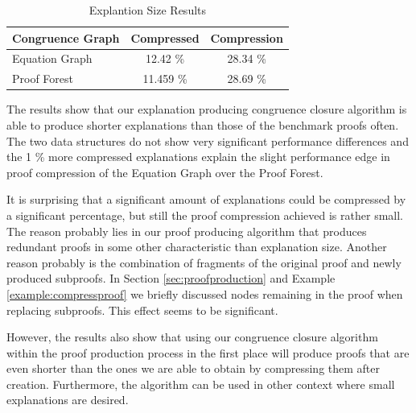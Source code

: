 
\begin{table}[h]
\centering
\begin{tabular}{l c c}
\toprule
\textbf{Congruence Graph} & \textbf{Compressed} & \textbf{Compression} \\ 
\midrule

Equation Graph & 12.42 \% & 28.34 \% \\ 
Proof Forest & 11.459 \% & 28.69 \% \\ 

\bottomrule
\end{tabular}
\caption{Explantion Size Results}
\label{tab:explanation_results}
\end{table}

The results show that our explanation producing congruence closure algorithm is able to produce shorter explanations than those of the benchmark proofs often.
The two data structures do not show very significant performance differences and the 1 \% more compressed explanations explain the slight performance edge in proof compression of the Equation Graph over the Proof Forest.

It is surprising that a significant amount of explanations could be compressed by a significant percentage, but still the proof compression achieved is rather small.
The reason probably lies in our proof producing algorithm that produces redundant proofs in some other characteristic than explanation size.
Another reason probably is the combination of fragments of the original proof and newly produced subproofs.
In Section \ref{sec:proofproduction} and Example \ref{example:compressproof} we briefly discussed nodes remaining in the proof when replacing subproofs.
This effect seems to be significant.

However, the results also show that using our congruence closure algorithm within the proof production process in the first place will produce proofs that are even shorter than the ones we are able to obtain by compressing them after creation.
Furthermore, the algorithm can be used in other context where small explanations are desired.
